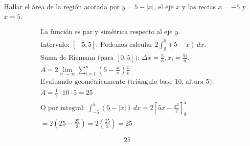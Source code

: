 Hallar el área de la región acotada por $y=5-|x|$, el eje $x$ y las rectas $x=-5$ y $x=5$.

\nopagebreak
\begin{align*}
\text{La función es par y simétrica respecto al eje } y. \\
\text{Intervalo: } [-5,5]. \text{ Podemos calcular } 2 \int_{0}^{5} (5-x) \, dx. \\
\text{Suma de Riemann (para } [0,5]\text{): } \Delta x = \frac{5}{n}, x_i = \frac{5i}{n}. \\
A = 2 \lim_{n \to \infty} \sum_{i=1}^{n} \left(5 - \frac{5i}{n}\right) \frac{5}{n} \\
\text{Evaluando geométricamente (triángulo base 10, altura 5):} \\
A = \frac{1}{2} \cdot 10 \cdot 5 = 25 \\
\text{O por integral: } \int_{-5}^{5} (5-|x|) \, dx = 2 \left[ 5x - \frac{x^2}{2} \right]_{0}^{5} \\
= 2 \left( 25 - \frac{25}{2} \right) = 2 \left( \frac{25}{2} \right) = 25
\end{align*}

\[
\boxed{\displaystyle 25}
\]
